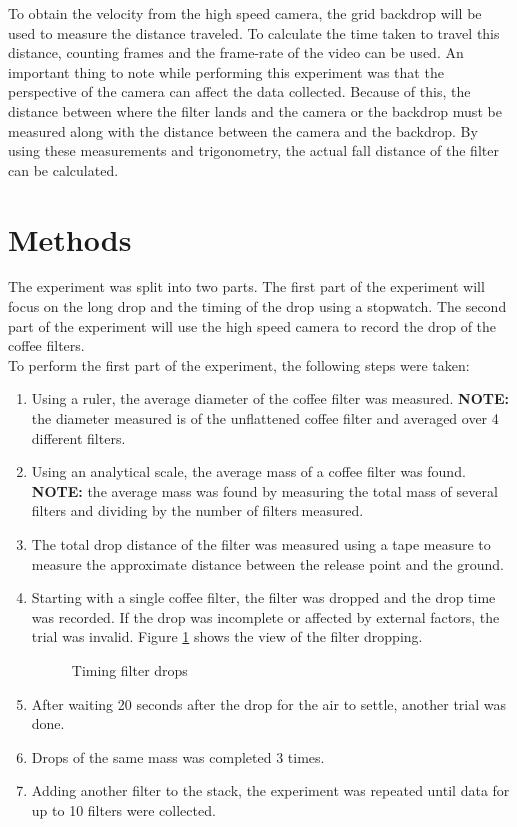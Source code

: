 \documentclass[12pt]{report}
\begin{document}
\noindent To obtain the velocity from the high speed camera, the grid backdrop will be used to measure the distance traveled. To calculate the time taken to travel this distance, counting frames and the frame-rate of the video can be used. An important thing to note while performing this experiment was that the perspective of the camera can affect the data collected. Because of this, the distance between where the filter lands and the camera or the backdrop must be measured along with the distance between the camera and the backdrop. By using these measurements and trigonometry, the actual fall distance of the filter can be calculated.\\

\newpage
\section*{Methods}

The experiment was split into two parts. The first part of the experiment will focus on the long drop and the timing of the drop using a stopwatch. The second part of the experiment will use the high speed camera to record the drop of the coffee filters.\\

\noindent To perform the first part of the experiment, the following steps were taken:

\begin{enumerate}
	\item Using a ruler, the average diameter of the coffee filter was measured. \textbf{NOTE:} the diameter measured is of the unflattened coffee filter and averaged over 4 different filters.
	\item Using an analytical scale, the average mass of a coffee filter was found. \textbf{NOTE:} the average mass was found by measuring the total mass of several filters and dividing by the number of filters measured.
	\item The total drop distance of the filter was measured using a tape measure to measure the approximate distance between the release point and the ground.
	\item Starting with a single coffee filter, the filter was dropped and the drop time was recorded. If the drop was incomplete or affected by external factors, the trial was invalid. Figure \ref{fig:filterdrop} shows the view of the filter dropping.
	\begin{figure}[h!]
		\centering
		\caption{Timing filter drops}
		\label{fig:filterdrop}
	\end{figure}
	\item After waiting 20 seconds after the drop for the air to settle, another trial was done.
	\item Drops of the same mass was completed 3 times.
	\item Adding another filter to the stack, the experiment was repeated until data for up to 10 filters were collected. 
\end{enumerate}
\end{document}
